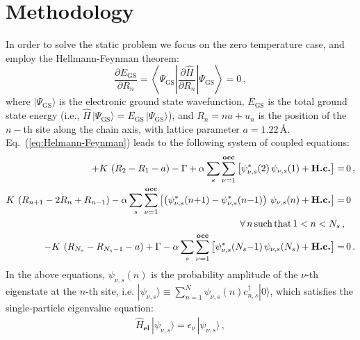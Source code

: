 \documentclass[10pt,a4paper]{article}
\begin{document}
\section{Methodology}

In order to solve the static problem we focus on the zero temperature case, and employ the Hellmann-Feynman theorem\cite{feynman39}:
%
\begin{equation}\label{eq:Helmann-Feynman}
\frac{\partial E_{\mathrm{GS}}}{\partial R_{n}} = \left\langle \Psi_{\mathrm{GS}} \left| \frac{\partial \hat{H}}{\partial R_{n}} \right| \Psi_{\mathrm{GS}} \right\rangle = 0 \, ,
\end{equation}
%
where $|\Psi_{\mathrm{GS}}\rangle$ is the electronic ground state wavefunction, $E_{\mathrm{GS}}$ is the total ground state energy (i.e., ${\hat{H} \, |\Psi_{\mathrm{GS}}\rangle = E_{\mathrm{GS}} \, |\Psi_{\mathrm{GS}}\rangle}$), and ${R_{n} = na + u_{n}}$ is the position of the $n-$th site along the chain axis, with lattice parameter ${a = 1.22 \, \textbf{\AA}}$. Eq.~(\ref{eq:Helmann-Feynman}) leads to the following system of coupled equations:
%
\begin{align}
+K \, \left( R_{2} - R_{1} - a \right) - \Gamma + \alpha \sum_{s}\sum_{\nu=1}^{\textbf{occ}} \left[ \psi_{\nu,s}^{*}(2) \, \psi_{\nu,s}(1) + \textbf{H.c.} \right] = & \, 0 \, , \label{eq:HF_L} \\
K \, \left( R_{n{+}1} - 2 R_{n} + R_{n{-}1} \right) - \alpha \sum_{s}\sum_{\nu=1}^{\textbf{occ}} \left[ \left( \psi_{\nu,s}^{*}(n{+}1) - \psi_{\nu,s}^{*}(n{-}1) \right) \, \psi_{\nu,s}(n) + \textbf{H.c.} \right] = & \, 0 \, \nonumber \\  \hfill \forall\, n\, \mathrm{such}\, \mathrm{that}\, 1<n<N_{s} \, , \label{eq:HF_mid} \\
-K \, \left( R_{N_{s}} - R_{N_{s}{-}1} - a \right) + \Gamma - \alpha \sum_{s}\sum_{\nu=1}^{\textbf{occ}} \left[ \psi_{\nu,s}^{*}(N_{s}{-}1) \, \psi_{\nu,s}(N_{s}) + \textbf{H.c.} \right] = & \, 0 \, . \label{eq:HF_R}
\end{align}
%
In the above equations, $\psi_{\nu,s}\left(n\right)$ is the probability amplitude of the $\nu$-th eigenstate at the $n$-th site, i.e. ${|\psi_{\nu,s}\rangle \equiv \sum_{n=1}^{N} \psi_{\nu,s}\left(n\right) c^\dagger_{n,s} |0\rangle}$, which satisfies the single-particle eigenvalue equation:
%
\begin{align}\label{eq:eigenvalue}
\hat{H}_{\textbf{el}} \, |\psi_{\nu,s} \rangle = \epsilon_{\nu} \, |\psi_{\nu,s} \rangle \, ,
\end{align}
\end{document}
